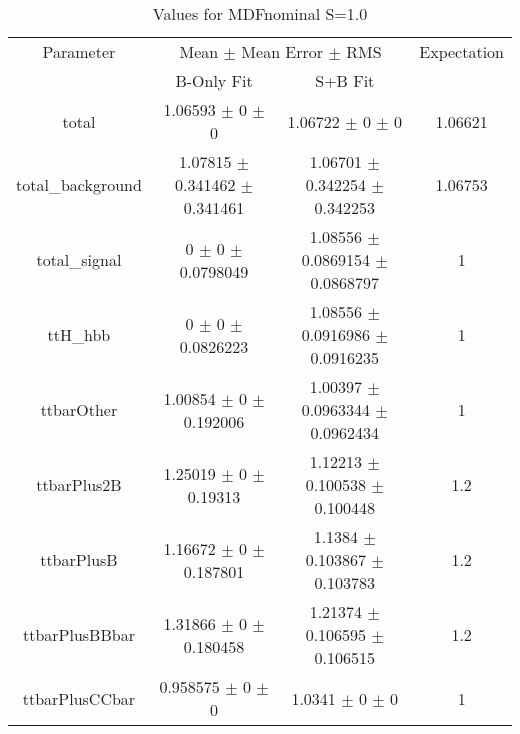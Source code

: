 \begin{table}
\centering
\caption{Values for MDFnominal S=1.0}
\begin{tabular}{cccc}
\toprule
Parameter & \multicolumn{2}{c}{Mean $\pm$ Mean Error $\pm$ RMS} & Expectation\\
 & B-Only Fit & S+B Fit & \\
\midrule
total & \num{1.06593} $\pm$ \num{0} $\pm$ \num{0} & \num{1.06722} $\pm$ \num{0} $\pm$ \num{0} & \num{1.06621}\\
total\_background & \num{1.07815} $\pm$ \num{0.341462} $\pm$ \num{0.341461} & \num{1.06701} $\pm$ \num{0.342254} $\pm$ \num{0.342253} & \num{1.06753}\\
total\_signal & \num{0} $\pm$ \num{0} $\pm$ \num{0.0798049} & \num{1.08556} $\pm$ \num{0.0869154} $\pm$ \num{0.0868797} & \num{1}\\
ttH\_hbb & \num{0} $\pm$ \num{0} $\pm$ \num{0.0826223} & \num{1.08556} $\pm$ \num{0.0916986} $\pm$ \num{0.0916235} & \num{1}\\
ttbarOther & \num{1.00854} $\pm$ \num{0} $\pm$ \num{0.192006} & \num{1.00397} $\pm$ \num{0.0963344} $\pm$ \num{0.0962434} & \num{1}\\
ttbarPlus2B & \num{1.25019} $\pm$ \num{0} $\pm$ \num{0.19313} & \num{1.12213} $\pm$ \num{0.100538} $\pm$ \num{0.100448} & \num{1.2}\\
ttbarPlusB & \num{1.16672} $\pm$ \num{0} $\pm$ \num{0.187801} & \num{1.1384} $\pm$ \num{0.103867} $\pm$ \num{0.103783} & \num{1.2}\\
ttbarPlusBBbar & \num{1.31866} $\pm$ \num{0} $\pm$ \num{0.180458} & \num{1.21374} $\pm$ \num{0.106595} $\pm$ \num{0.106515} & \num{1.2}\\
ttbarPlusCCbar & \num{0.958575} $\pm$ \num{0} $\pm$ \num{0} & \num{1.0341} $\pm$ \num{0} $\pm$ \num{0} & \num{1}\\
\bottomrule
\end{tabular}
\end{table}